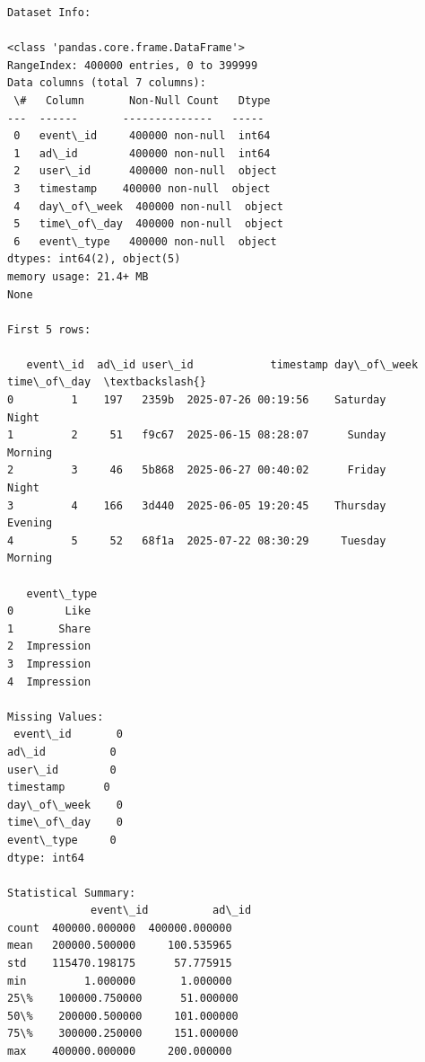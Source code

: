 \documentclass[11pt]{article}
\begin{document}
    \begin{Verbatim}[commandchars=\\\{\}]
Dataset Info:

<class 'pandas.core.frame.DataFrame'>
RangeIndex: 400000 entries, 0 to 399999
Data columns (total 7 columns):
 \#   Column       Non-Null Count   Dtype
---  ------       --------------   -----
 0   event\_id     400000 non-null  int64
 1   ad\_id        400000 non-null  int64
 2   user\_id      400000 non-null  object
 3   timestamp    400000 non-null  object
 4   day\_of\_week  400000 non-null  object
 5   time\_of\_day  400000 non-null  object
 6   event\_type   400000 non-null  object
dtypes: int64(2), object(5)
memory usage: 21.4+ MB
None

First 5 rows:

   event\_id  ad\_id user\_id            timestamp day\_of\_week time\_of\_day  \textbackslash{}
0         1    197   2359b  2025-07-26 00:19:56    Saturday       Night
1         2     51   f9c67  2025-06-15 08:28:07      Sunday     Morning
2         3     46   5b868  2025-06-27 00:40:02      Friday       Night
3         4    166   3d440  2025-06-05 19:20:45    Thursday     Evening
4         5     52   68f1a  2025-07-22 08:30:29     Tuesday     Morning

   event\_type
0        Like
1       Share
2  Impression
3  Impression
4  Impression

Missing Values:
 event\_id       0
ad\_id          0
user\_id        0
timestamp      0
day\_of\_week    0
time\_of\_day    0
event\_type     0
dtype: int64

Statistical Summary:
             event\_id          ad\_id
count  400000.000000  400000.000000
mean   200000.500000     100.535965
std    115470.198175      57.775915
min         1.000000       1.000000
25\%    100000.750000      51.000000
50\%    200000.500000     101.000000
75\%    300000.250000     151.000000
max    400000.000000     200.000000
    \end{Verbatim}

    \begin{center}
    \end{center}
    { \hspace*{\fill} \\}
    
\end{document}
